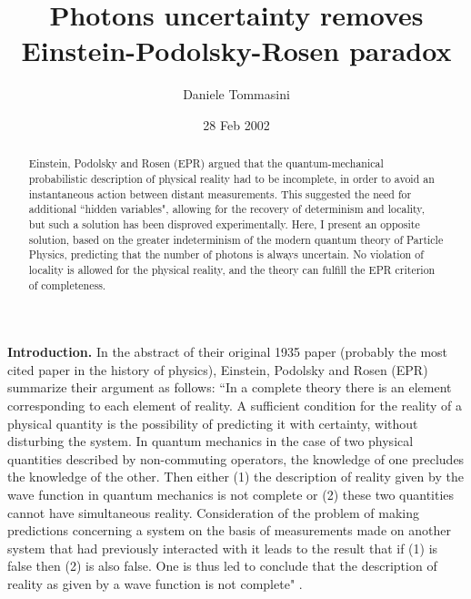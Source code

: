 \documentclass[aps,prl,showkeys,showpacs,preprint,groupedaddress]{revtex4}
\begin{document}
\title{Photons uncertainty removes Einstein-Podolsky-Rosen paradox}

\author{Daniele Tommasini}



\date{28 Feb 2002\medskip}

\begin{abstract}
Einstein, Podolsky and Rosen (EPR) argued that the
quantum-mechanical probabilistic description of physical reality
had to be incomplete, in order to avoid an instantaneous action
between distant measurements. This suggested the need for
additional ``hidden variables", allowing for the recovery of
determinism and locality, but such a solution has been disproved
experimentally. Here, I present an opposite solution, based on the
greater indeterminism of the modern quantum theory of Particle
Physics, predicting that the number of photons is always
uncertain. No violation of locality is allowed for the physical
reality, and the theory can fulfill the EPR criterion of
completeness.
\end{abstract}




\maketitle

{\bf Introduction.} In the abstract of their original 1935 paper
(probably the most cited paper in the history of physics),
Einstein, Podolsky and Rosen (EPR) summarize their argument as
follows: ``In a complete theory there is an element corresponding
to each element of reality. A sufficient condition for the reality
of a physical quantity is the possibility of predicting it with
certainty, without disturbing the system. In quantum mechanics in
the case of two physical quantities described by non-commuting
operators, the knowledge of one precludes the knowledge of the
other. Then either (1) the description of reality given by the
wave function in quantum mechanics is not complete or (2) these
two quantities cannot have simultaneous reality. Consideration of
the problem of making predictions concerning a system on the basis
of measurements made on another system that had previously
interacted with it leads to the result that if (1) is false then
(2) is also false. One is thus led to conclude that the
description of reality as given by a wave function is not
complete" \cite{EPR}.
\end{document}
